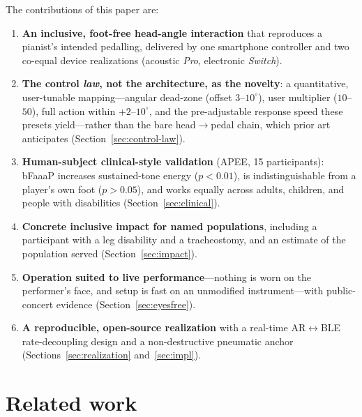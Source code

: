 The contributions of this paper are:
\begin{enumerate}
  \item \textbf{An inclusive, foot-free head-angle interaction} that reproduces a
  pianist's intended pedalling, delivered by one smartphone controller and two
  co-equal device realizations (acoustic \emph{Pro}, electronic \emph{Switch}).
  \item \textbf{The control \emph{law}, not the architecture, as the novelty}: a
  quantitative, user-tunable mapping---angular dead-zone (offset $3$--$10^\circ$),
  user multiplier ($10$--$50$), full action within $+2$--$10^\circ$, and the
  pre-adjustable response speed these presets yield---rather than the bare
  head$\rightarrow$pedal chain,
  which prior art anticipates (Section~\ref{sec:control-law}).
  \item \textbf{Human-subject clinical-style validation} (APEE, 15 participants):
  bFaaaP increases sustained-tone energy ($p<0.01$), is indistinguishable from a
  player's own foot ($p>0.05$), and works equally across adults, children, and
  people with disabilities (Section~\ref{sec:clinical}).
  \item \textbf{Concrete inclusive impact for named populations}, including a
  participant with a leg disability and a tracheostomy, and an estimate of the
  population served (Section~\ref{sec:impact}).
  \item \textbf{Operation suited to live performance}---nothing is worn on the
  performer's face, and setup is fast on an unmodified instrument---with
  public-concert evidence (Section~\ref{sec:eyesfree}).
  \item \textbf{A reproducible, open-source realization} with a real-time
  AR$\leftrightarrow$BLE rate-decoupling design and a non-destructive pneumatic
  anchor (Sections~\ref{sec:realization} and~\ref{sec:impl}).
\end{enumerate}

\section{Related work}
\label{sec:related}

